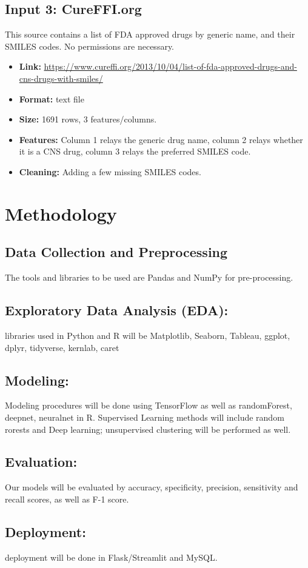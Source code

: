 \documentclass{report}
\begin{document}
\section{Input 3: CureFFI.org}
This source contains a list of FDA approved drugs by generic name, and their SMILES codes. No permissions are necessary.
\begin{itemize}
    \item \textbf{Link:} \url{https://www.cureffi.org/2013/10/04/list-of-fda-approved-drugs-and-cns-drugs-with-smiles/}
    \item \textbf{Format:} text file
    \item \textbf{Size:} 1691 rows, 3 features/columns.
    \item \textbf{Features:} Column 1 relays the generic drug name, column 2 relays whether it is a CNS drug, column 3 relays the preferred SMILES code.
    \item \textbf{Cleaning:} Adding a few missing SMILES codes.
\end{itemize}

\chapter{Methodology}
\section{Data Collection and Preprocessing}
The tools and libraries to be used are Pandas and NumPy for pre-processing.
\section{Exploratory Data Analysis (EDA):}
libraries used in Python and R will be Matplotlib, Seaborn, Tableau, ggplot, dplyr, tidyverse, kernlab, caret
\section{Modeling:}
Modeling procedures will be done using TensorFlow as well as randomForest, deepnet, neuralnet in R. Supervised Learning methods will include random rorests and Deep learning; unsupervised clustering will be performed as well.
\section{Evaluation:}
Our models will be evaluated by accuracy, specificity, precision, sensitivity and recall scores, as well as F-1 score.
\section{Deployment:}
deployment will be done in Flask/Streamlit and MySQL.
\end{document}
